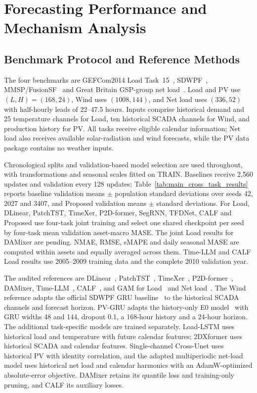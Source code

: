 \documentclass[journal]{IEEEtran}
\begin{document}
\section{Forecasting Performance and Mechanism Analysis}
\label{sec:original_experiments}

\subsection{Benchmark Protocol and Reference Methods}

The four benchmarks are GEFCom2014 Load Task~15~\cite{hong2016gefcom2014}, SDWPF~\cite{zhou2024sdwpf}, MMSP/FusionSF~\cite{ma2024fusionsf} and Great Britain GSP-group net load~\cite{browell2021regionalNetLoad}. Load and PV use $(L,H)=(168,24)$, Wind uses $(1008,144)$, and Net load uses $(336,52)$ with half-hourly leads of 22--47.5 hours. Inputs comprise historical demand and 25 temperature channels for Load, ten historical SCADA channels for Wind, and production history for PV. All tasks receive eligible calendar information; Net load also receives available solar-radiation and wind forecasts, while the PV data package contains no weather inputs.

Chronological splits and validation-based model selection are used throughout, with transformations and seasonal scales fitted on TRAIN. Baselines receive 2,560 updates and validation every 128 updates; Table~\ref{tab:main_cross_task_results} reports baseline validation means $\pm$ population standard deviations over seeds 42, 2027 and 3407, and Proposed validation means $\pm$ standard deviations. For Load, DLinear, PatchTST, TimeXer, P2D-former, SegRNN, TFDNet, CALF and Proposed use four-task joint training and select one shared checkpoint per seed by four-task mean validation asset-macro MASE. The joint Load results for DAMixer are pending. NMAE, RMSE, sMAPE and daily seasonal MASE are computed within assets and equally averaged across them. Time-LLM and CALF Load results use 2005--2009 training data and the complete 2010 validation year.

The audited references are DLinear~\cite{zeng2023dlinear}, PatchTST~\cite{nie2023patchtst}, TimeXer~\cite{wang2024timexer}, P2D-former~\cite{hong2026p2dformer}, DAMixer, Time-LLM~\cite{jin2024timellm}, CALF~\cite{liu2025calf}, and GAM for Load~\cite{hong2016probabilistic} and Net load~\cite{telle2024probabilistic}. The Wind reference adapts the official SDWPF GRU baseline~\cite{zhou2024sdwpf} to the historical SCADA channels and forecast horizon. PV-GRU adapts the history-only E0 model~\cite{pour2026historypv} with GRU widths 48 and 144, dropout 0.1, a 168-hour history and a 24-hour horizon. The additional task-specific models are trained separately. Load-LSTM uses historical load and temperature with future calendar features; 2DXformer uses historical SCADA and calendar features. Single-channel Cross-Unet uses historical PV with identity correlation, and the adapted multiperiodic net-load model uses historical net load and calendar harmonics with an AdamW-optimized absolute-error objective. DAMixer retains its quantile loss and training-only pruning, and CALF its auxiliary losses.
\end{document}

